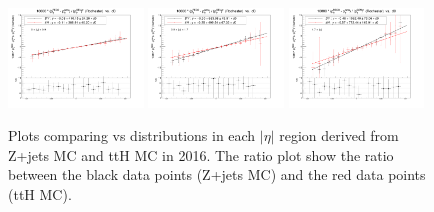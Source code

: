 \begin{figure}[h!]
    \centering
    \includegraphics[width=0.32\textwidth]{images_geofit/ttH_eta_0_0p9_2016.png}
    \includegraphics[width=0.32\textwidth]{images_geofit/ttH_eta_0p9_1p7_2016.png}
    \includegraphics[width=0.32\textwidth]{images_geofit/ttH_eta_1p7_inf_2016.png}
    \caption{Plots comparing \dptoverptsquare vs \dzeroBS distributions in each $|\eta|$ region derived from Z+jets MC and ttH MC in 2016. The ratio plot show the ratio between the black data points (Z+jets MC) and the red data points (ttH MC).}
    \label{fig:ttH_d0_2016}
\end{figure}

